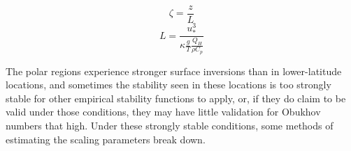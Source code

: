 \begin{equation}\label{eq:zl}
\zeta = \frac{z}{L}
\end{equation}
\begin{equation}\label{eq:l}
L = \frac{u_{*}^{3}}{\kappa \frac{g}{T} \frac{Q_{H}}{\rho C_{p}}}
\end{equation}

The polar regions experience stronger surface inversions than in lower-latitude locations, and sometimes the stability seen in these locations is too strongly stable for other empirical stability functions to apply, or, if they do claim to be valid under those conditions, they may have little validation for Obukhov numbers that high. Under these strongly stable conditions, some methods of estimating the scaling parameters break down. 




